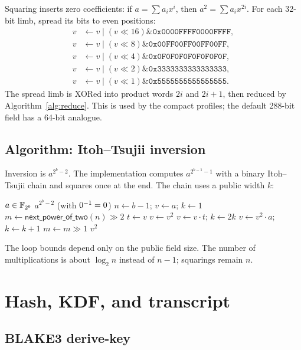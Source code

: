 \documentclass[11pt,a4paper]{article}
\begin{document}
Squaring inserts zero coefficients: if $a=\sum a_i x^i$, then
$a^2=\sum a_i x^{2i}$. For each 32-bit limb, spread its bits to even positions:
\begin{align}
v&\gets v\mathbin{|}(v\ll16) \mathbin{\&} \texttt{0x0000FFFF0000FFFF},\\
v&\gets v\mathbin{|}(v\ll8)  \mathbin{\&} \texttt{0x00FF00FF00FF00FF},\\
v&\gets v\mathbin{|}(v\ll4)  \mathbin{\&} \texttt{0x0F0F0F0F0F0F0F0F},\\
v&\gets v\mathbin{|}(v\ll2)  \mathbin{\&} \texttt{0x3333333333333333},\\
v&\gets v\mathbin{|}(v\ll1)  \mathbin{\&} \texttt{0x5555555555555555}.
\end{align}
The spread limb is XORed into product words $2i$ and $2i+1$, then reduced by
Algorithm~\ref{alg:reduce}. This is used by the compact profiles; the default
288-bit field has a 64-bit analogue.

\subsection{Algorithm: Itoh--Tsujii inversion}

Inversion is $a^{2^b-2}$. The implementation computes
$a^{2^{b-1}-1}$ with a binary Itoh--Tsujii chain and squares once at the end.
The chain uses a public width $k$:
\begin{algorithm}[ht]
\caption{$\mathsf{inv}(a)$ for $\F{b}$}
\label{alg:inv}
\begin{algorithmic}[1]
\REQUIRE $a\in\mathbb{F}_{2^{b}}$
\ENSURE $a^{2^b-2}$ (with $0^{-1}=0$)
\STATE $n\gets b-1$; $v\gets a$; $k\gets1$
\STATE $m\gets\mathsf{next\_power\_of\_two}(n)\gg2$
  \STATE $t\gets v$
    \STATE $v\gets v^2$
  \ENDFOR
  \STATE $v\gets v\cdot t$; $k\gets2k$
    \STATE $v\gets v^2\cdot a$; $k\gets k+1$
  \ENDIF
  \STATE $m\gets m\gg1$
\ENDWHILE
\RETURN $v^2$
\end{algorithmic}
\end{algorithm}
The loop bounds depend only on the public field size. The number of
multiplications is about $\log_2 n$ instead of $n-1$; squarings remain
$n$.

\section{Hash, KDF, and transcript}

\subsection{BLAKE3 derive-key}
\end{document}

